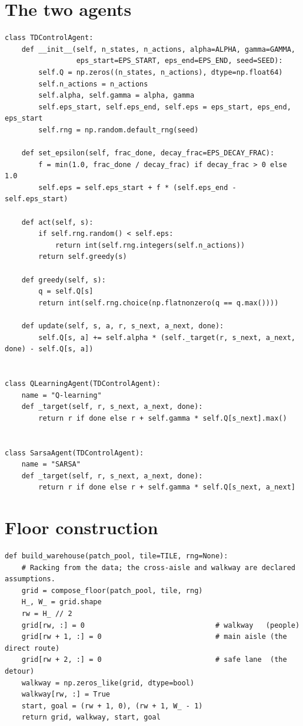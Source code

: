 \section{The two agents}

{\small
\begin{verbatim}
class TDControlAgent:
    def __init__(self, n_states, n_actions, alpha=ALPHA, gamma=GAMMA,
                 eps_start=EPS_START, eps_end=EPS_END, seed=SEED):
        self.Q = np.zeros((n_states, n_actions), dtype=np.float64)
        self.n_actions = n_actions
        self.alpha, self.gamma = alpha, gamma
        self.eps_start, self.eps_end, self.eps = eps_start, eps_end, eps_start
        self.rng = np.random.default_rng(seed)

    def set_epsilon(self, frac_done, decay_frac=EPS_DECAY_FRAC):
        f = min(1.0, frac_done / decay_frac) if decay_frac > 0 else 1.0
        self.eps = self.eps_start + f * (self.eps_end - self.eps_start)

    def act(self, s):
        if self.rng.random() < self.eps:
            return int(self.rng.integers(self.n_actions))
        return self.greedy(s)

    def greedy(self, s):
        q = self.Q[s]
        return int(self.rng.choice(np.flatnonzero(q == q.max())))

    def update(self, s, a, r, s_next, a_next, done):
        self.Q[s, a] += self.alpha * (self._target(r, s_next, a_next, done) - self.Q[s, a])


class QLearningAgent(TDControlAgent):
    name = "Q-learning"
    def _target(self, r, s_next, a_next, done):
        return r if done else r + self.gamma * self.Q[s_next].max()


class SarsaAgent(TDControlAgent):
    name = "SARSA"
    def _target(self, r, s_next, a_next, done):
        return r if done else r + self.gamma * self.Q[s_next, a_next]
\end{verbatim}}

\section{Floor construction}

{\small
\begin{verbatim}
def build_warehouse(patch_pool, tile=TILE, rng=None):
    # Racking from the data; the cross-aisle and walkway are declared assumptions.
    grid = compose_floor(patch_pool, tile, rng)
    H_, W_ = grid.shape
    rw = H_ // 2
    grid[rw, :] = 0                               # walkway   (people)
    grid[rw + 1, :] = 0                           # main aisle (the direct route)
    grid[rw + 2, :] = 0                           # safe lane  (the detour)
    walkway = np.zeros_like(grid, dtype=bool)
    walkway[rw, :] = True
    start, goal = (rw + 1, 0), (rw + 1, W_ - 1)
    return grid, walkway, start, goal
\end{verbatim}}

